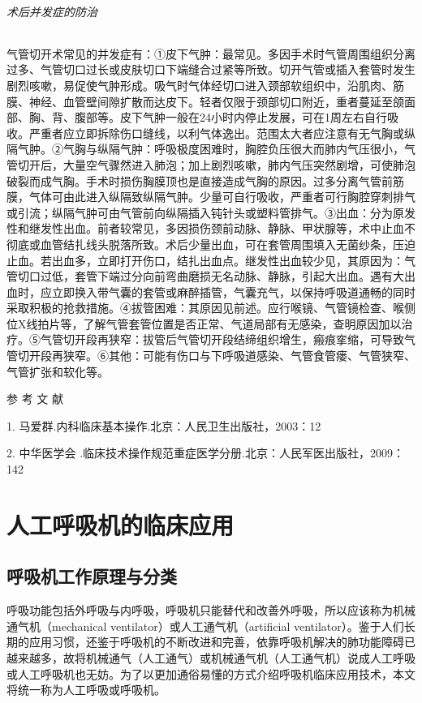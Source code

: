\subparagraph{术后并发症的防治}

气管切开术常见的并发症有：①皮下气肿：最常见。多因手术时气管周围组织分离过多、气管切口过长或皮肤切口下端缝合过紧等所致。切开气管或插入套管时发生剧烈咳嗽，易促使气肿形成。吸气时气体经切口进入颈部软组织中，沿肌肉、筋膜、神经、血管壁间隙扩散而达皮下。轻者仅限于颈部切口附近，重者蔓延至颌面部、胸、背、腹部等。皮下气肿一般在24小时内停止发展，可在1周左右自行吸收。严重者应立即拆除伤口缝线，以利气体逸出。范围太大者应注意有无气胸或纵隔气肿。②气胸与纵隔气肿：呼吸极度困难时，胸腔负压很大而肺内气压很小，气管切开后，大量空气骤然进入肺泡；加上剧烈咳嗽，肺内气压突然剧增，可使肺泡破裂而成气胸。手术时损伤胸膜顶也是直接造成气胸的原因。过多分离气管前筋膜，气体可由此进入纵隔致纵隔气肿。少量可自行吸收，严重者可行胸腔穿刺排气或引流；纵隔气肿可由气管前向纵隔插入钝针头或塑料管排气。③出血：分为原发性和继发性出血。前者较常见，多因损伤颈前动脉、静脉、甲状腺等，术中止血不彻底或血管结扎线头脱落所致。术后少量出血，可在套管周围填入无菌纱条，压迫止血。若出血多，立即打开伤口，结扎出血点。继发性出血较少见，其原因为：气管切口过低，套管下端过分向前弯曲磨损无名动脉、静脉，引起大出血。遇有大出血时，应立即换入带气囊的套管或麻醉插管，气囊充气，以保持呼吸道通畅的同时采取积极的抢救措施。④拔管困难：其原因见前述。应行喉镜、气管镜检查、喉侧位X线拍片等，了解气管套管位置是否正常、气道局部有无感染，查明原因加以治疗。⑤气管切开段再狭窄：拔管后气管切开段结缔组织增生，瘢痕挛缩，可导致气管切开段再狭窄。⑥其他：可能有伤口与下呼吸道感染、气管食管瘘、气管狭窄、气管扩张和软化等。

\protect\hypertarget{text00366.html}{}{}

\hypertarget{text00366.htmlux5cux23CHP16-2-5}{}
参 考 文 献

1. 马爱群.内科临床基本操作.北京：人民卫生出版社，2003：12

2. 中华医学会
.临床技术操作规范重症医学分册.北京：人民军医出版社，2009：142

\protect\hypertarget{text00367.html}{}{}

\chapter{人工呼吸机的临床应用}

\section{呼吸机工作原理与分类}

呼吸功能包括外呼吸与内呼吸，呼吸机只能替代和改善外呼吸，所以应该称为机械通气机（mechanical
ventilator）或人工通气机（artificial
ventilator）。鉴于人们长期的应用习惯，还鉴于呼吸机的不断改进和完善，依靠呼吸机解决的肺功能障碍已越来越多，故将机械通气（人工通气）或机械通气机（人工通气机）说成人工呼吸或人工呼吸机也无妨。为了以更加通俗易懂的方式介绍呼吸机临床应用技术，本文将统一称为人工呼吸或呼吸机。


